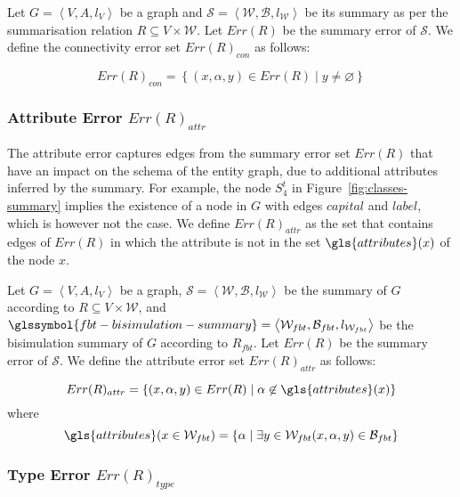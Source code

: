 \begin{definition}
Let $G=\left\langle V, A, l_V \right\rangle$ be a graph and $\mathcal{S} = \left\langle \mathcal{W}, \mathcal{B}, l_{\mathcal{W}} \right\rangle$ be its summary as per the summarisation relation $R \subseteq V \times \mathcal{W}$. Let $Err(R)$ be the summary error of $\mathcal{S}$. We define the connectivity error set $Err(R)_{con}$ as follows:

$$
Err(R)_{con} = \left\lbrace (x, \alpha, y) \in Err(R) \mid y \neq \varnothing \right\rbrace
$$
\end{definition}

\subsubsection{Attribute Error $Err(R)_{attr}$}

The attribute error captures edges from the summary error set $Err(R)$ that have an impact on the schema of the entity graph, due to additional \gls{attributes} inferred by the summary. For example, the node $S^t_4$ in Figure~\ref{fig:classes-summary} implies the existence of a node in $G$ with edges $capital$ and $label$, which is however not the case. We define $Err(R)_{attr}$ as the set that contains edges of $Err(R)$ in which the attribute is not in the set $\gls{attributes}(x)$ of the node $x$.

\begin{definition}
	Let $G=\left\langle V, A, l_V \right\rangle$ be a graph, $\mathcal{S} = \left\langle \mathcal{W}, \mathcal{B}, l_{\mathcal{W}} \right\rangle$ be the summary of $G$ according to $R \subseteq V \times \mathcal{W}$, and $\glssymbol{fbt-bisimulation-summary} = \left\langle \mathcal{W}_{fbt}, \mathcal{B}_{fbt}, l_{\mathcal{W}_{fbt}} \right\rangle$ be the bisimulation summary of $G$ according to $R_{fbt}$. Let $Err(R)$ be the summary error of $\mathcal{S}$. We define the attribute error set $Err(R)_{attr}$ as follows:

	$$
	Err(R)_{attr} = \left\lbrace (x, \alpha, y) \in Err(R) \mid \alpha \not \in \gls{attributes}(x) \right\rbrace
	$$
	where
	$$
	\gls{attributes}(x \in \mathcal{W}_{fbt}) = \left\lbrace \alpha \mid \exists y \in \mathcal{W}_{fbt} (x, \alpha, y) \in \mathcal{B}_{fbt} \right\rbrace
	$$
\end{definition}

\subsubsection{Type Error $Err(R)_{type}$}


